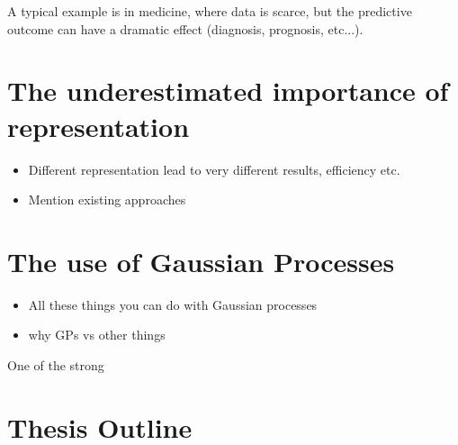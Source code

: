 A typical example is in medicine, where data is scarce, but the predictive outcome can have a dramatic effect (diagnosis, prognosis, etc...).



\section{The underestimated importance of representation}

\begin{itemize}
    \item Different representation lead to very different results, efficiency etc.
    \item Mention existing approaches
\end{itemize}


\section{The use of Gaussian Processes}

\begin{itemize}
    \item All these things you can do with Gaussian processes
    \item why \ac{GPs} vs other things
\end{itemize}

One of the strong

\section{Thesis Outline}


